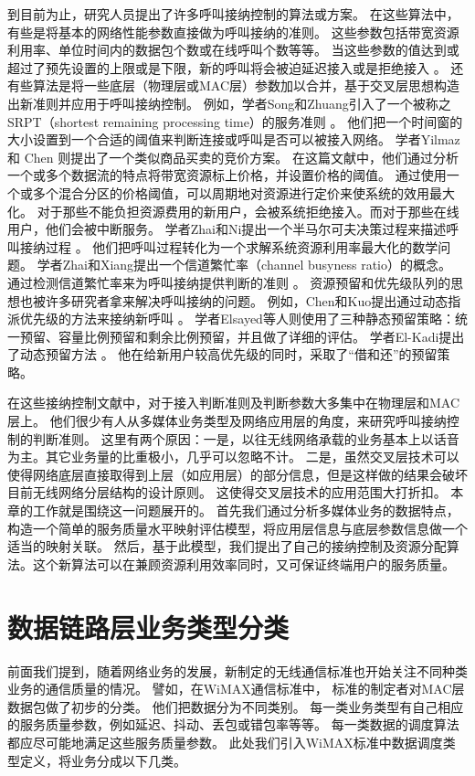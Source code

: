 到目前为止，研究人员提出了许多呼叫接纳控制的算法或方案。
在这些算法中，有些是将基本的网络性能参数直接做为呼叫接纳的准则。
这些参数包括带宽资源利用率、单位时间内的数据包个数或在线呼叫个数等等。
当这些参数的值达到或超过了预先设置的上限或是下限，新的呼叫将会被迫延迟接入或是拒绝接入\cite{Y-Qian.TWC.2006} \cite{G-Djuka.TELSIK.2007}。
还有些算法是将一些底层（物理层或MAC层）参数加以合并，基于交叉层思想构造出新准则并应用于呼叫接纳控制。
例如，学者Song和Zhuang引入了一个被称之SRPT（shortest remaining processing time）的服务准则 \cite{Song2009}。
他们把一个时间窗的大小设置到一个合适的阈值来判断连接或呼叫是否可以被接入网络。
学者Yilmaz 和 Chen 则提出了一个类似商品买卖的竞价方案\cite{Yilmax2009}。
在这篇文献中，他们通过分析一个或多个数据流的特点将带宽资源标上价格，并设置价格的阈值。
通过使用一个或多个混合分区的价格阈值，可以周期地对资源进行定价来使系统的效用最大化。
对于那些不能负担资源费用的新用户，会被系统拒绝接入。而对于那些在线用户，他们会被中断服务。
学者Zhai和Ni提出一个半马尔可夫决策过程来描述呼叫接纳过程 \cite{Zhai2005,Ni2009}。
他们把呼叫过程转化为一个求解系统资源利用率最大化的数学问题。
学者Zhai和Xiang提出一个信道繁忙率（channel busyness ratio）的概念。
通过检测信道繁忙率来为呼叫接纳提供判断的准则 \cite{Zhai_Chen_Fang_2006}。
资源预留和优先级队列的思想也被许多研究者拿来解决呼叫接纳的问题。
例如，Chen和Kuo提出通过动态指派优先级的方法来接纳新呼叫 \cite{Chen_Kumar_Kuo_2003,Chen_Kuo_2004}。
学者Elsayed等人则使用了三种静态预留策略：统一预留、容量比例预留和剩余比例预留，并且做了详细的评估\cite{Elsayed02performanceevaluation}。
学者El-Kadi提出了动态预留方法 \cite{EL-Kadi2002}。
他在给新用户较高优先级的同时，采取了“借和还”的预留策略。

在这些接纳控制文献中，对于接入判断准则及判断参数大多集中在物理层和MAC层上。
他们很少有人从多媒体业务类型及网络应用层的角度，来研究呼叫接纳控制的判断准则。
这里有两个原因：一是，以往无线网络承载的业务基本上以话音为主。其它业务量的比重极小，几乎可以忽略不计。
二是，虽然交叉层技术可以使得网络底层直接取得到上层（如应用层）的部分信息，但是这样做的结果会破坏目前无线网络分层结构的设计原则。
这使得交叉层技术的应用范围大打折扣。
本章的工作就是围绕这一问题展开的。
首先我们通过分析多媒体业务的数据特点，构造一个简单的服务质量水平映射评估模型，将应用层信息与底层参数信息做一个适当的映射关联。
然后，基于此模型，我们提出了自己的接纳控制及资源分配算法。这个新算法可以在兼顾资源利用效率同时，又可保证终端用户的服务质量。
%
\section{数据链路层业务类型分类}
前面我们提到，随着网络业务的发展，新制定的无线通信标准也开始关注不同种类业务的通信质量的情况。
譬如，在WiMAX通信标准中，
标准的制定者对MAC层数据包做了初步的分类\cite{Tsagkaris_Demestichas_2009}\cite{Andrews_Ghosh_Muhamed_2007}。
他们把数据分为不同类别。
每一类业务类型有自己相应的服务质量参数，例如延迟、抖动、丢包或错包率等等。
每一类数据的调度算法都应尽可能地满足这些服务质量参数。
此处我们引入WiMAX标准中数据调度类型定义，将业务分成以下几类。

